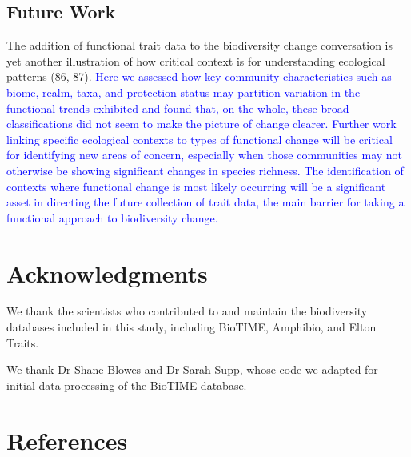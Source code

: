 \documentclass{article}
\begin{document}
\hypertarget{future-work}{%
\subsection{Future Work}\label{future-work}}

The addition of functional trait data to the biodiversity change
conversation is yet another illustration of how critical context is for
understanding ecological patterns (86, 87).
\textcolor{blue}{Here we assessed how key community characteristics such as biome, realm, taxa, and protection status may partition variation in the functional trends exhibited and found that, on the whole, these broad classifications did not seem to make the picture of change clearer. Further work linking specific ecological contexts to types of functional change will be critical for identifying new areas of concern, especially when those communities may not otherwise be showing significant changes in species richness. The identification of contexts where functional change is most likely occurring will be a significant asset in directing the future collection of trait data, the main barrier for taking a functional approach to biodiversity change.}

\hypertarget{acknowledgments}{%
\section{Acknowledgments}\label{acknowledgments}}

We thank the scientists who contributed to and maintain the biodiversity
databases included in this study, including BioTIME, Amphibio, and Elton
Traits.

We thank Dr Shane Blowes and Dr Sarah Supp, whose code we adapted for
initial data processing of the BioTIME database.

\hypertarget{references}{%
\section*{References}\label{references}}
\end{document}
